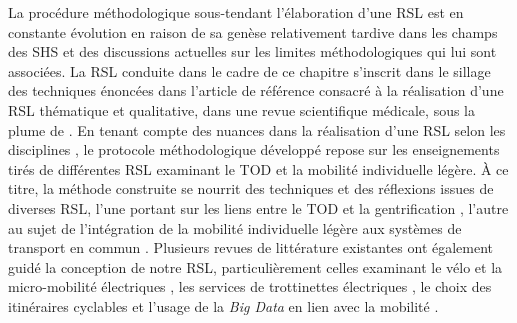 \begin{refsegment}
La procédure méthodologique sous-tendant l'élaboration d'une \acrshort{RSL} est en constante évolution en raison de sa genèse relativement tardive dans les champs des \acrshort{SHS} et des discussions actuelles sur les limites méthodologiques qui lui sont associées. La \acrshort{RSL} conduite dans le cadre de ce chapitre s'inscrit dans le sillage des techniques énoncées dans l'article de référence consacré à la réalisation d'une \acrshort{RSL} thématique et qualitative, dans une revue scientifique médicale, sous la plume de \textcolor{blue}{\textcite[3-7]{thomas_methods_2008}}. En tenant compte des nuances dans la réalisation d'une \acrshort{RSL} selon les disciplines \textcolor{blue}{\autocite[738]{padeiro_transit-oriented_2019}}, le protocole méthodologique développé repose sur les enseignements tirés de différentes \acrshort{RSL} examinant le \acrshort{TOD} et la mobilité individuelle légère. À ce titre, la méthode construite se nourrit des techniques et des réflexions issues de diverses \acrshort{RSL}, l'une portant sur les liens entre le \acrshort{TOD} et la gentrification \textcolor{blue}{\autocite[738]{padeiro_transit-oriented_2019}}, l'autre au sujet de l'intégration de la mobilité individuelle légère aux systèmes de transport en commun \textcolor{blue}{\autocite[4]{oeschger_micromobility_2020}}. Plusieurs revues de littérature existantes ont également guidé la conception de notre \acrshort{RSL}, particulièrement celles examinant le vélo et la micro-mobilité électriques \textcolor{blue}{\autocite[3]{sengul_impacts_2021}}, les services de trottinettes électriques \textcolor{blue}{\autocite[4]{bozzi_shared_2021}}, le choix des itinéraires cyclables \textcolor{blue}{\autocite[2]{pritchard_revealed_2018}} et l'usage de la \textsl{Big Data} en lien avec la mobilité \textcolor{blue}{\autocite[36]{neilson_systematic_2019}}.%


\end{refsegment}
